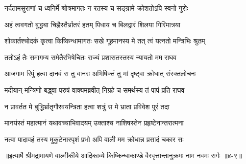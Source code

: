 \twolineshloka
{नर्दतामसुराणां च ध्वनिर्मे श्रोत्रमागतः}
{न रतस्य च सङ्ग्रामे क्रोशतोऽपि स्वनो गुरोः} %

\twolineshloka
{अहं त्ववगतो बुद्ध्या चिह्नैस्तैर्भ्रातरं हतम्}
{पिधाय च बिलद्वारं शिलया गिरिमात्रया} %

\twolineshloka
{शोकार्तश्चोदकं कृत्वा किष्किन्धामागतः सखे}
{गूहमानस्य मे तत् त्वं यत्नतो मन्त्रिभिः श्रुतम्} %

\twolineshloka
{ततोऽहं तैः समागम्य समेतैरभिषेचितः}
{राज्यं प्रशासतस्तस्य न्यायतो मम राघव} %

\twolineshloka
{आजगाम रिपुं हत्वा दानवं स तु वानरः}
{अभिषिक्तं तु मां दृष्ट्वा क्रोधात् संरक्तलोचनः} %

\twolineshloka
{मदीयान् मन्त्रिणो बद्ध्वा परुषं वाक्यमब्रवीत्}
{निग्रहे च समर्थस्य तं पापं प्रति राघव} %

\twolineshloka
{न प्रावर्तत मे बुद्धिर्भ्रातृगौरवयन्त्रिता}
{हत्वा शत्रुं स मे भ्राता प्रविवेश पुरं तदा} %

\twolineshloka
{मानयंस्तं महात्मानं यथावच्चाभिवादयम्}
{उक्ताश्च नाशिषस्तेन प्रहृष्टेनान्तरात्मना} %

\twolineshloka
{नत्वा पादावहं तस्य मुकुटेनास्पृशं प्रभो}
{अपि वाली मम क्रोधान्न प्रसादं चकार सः} %


॥इत्यार्षे श्रीमद्रामायणे वाल्मीकीये आदिकाव्ये किष्किन्धाकाण्डे वैरवृत्तान्तानुक्रमः नाम नवमः सर्गः ॥४-९॥
